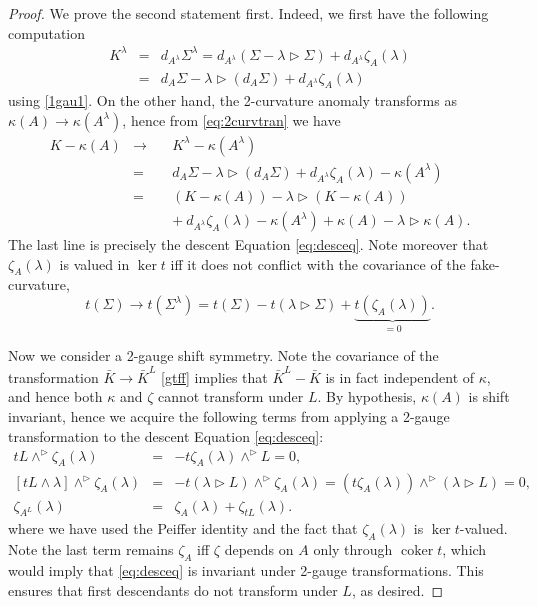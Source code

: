 \documentclass[onecolumn]{article}
\theoremstyle{theorem}
\theoremstyle{remark}
\theoremstyle{example}
\theoremstyle{definition}
\numberwithin{equation}{section}
\begin{document}
\begin{proof}
We prove the second statement first. Indeed, we first have the following computation 
\begin{eqnarray}
  K^\lambda &=& d_{A^\lambda}\Sigma^\lambda = d_{A^\lambda}(\Sigma-\lambda\rhd \Sigma) +d_{A^\lambda}\zeta_A(\lambda) \nonumber\\
  &=& d_A\Sigma - \lambda \rhd (d_A\Sigma) + d_{A^\lambda}\zeta_A(\lambda)\label{eq:2curvtran}
\end{eqnarray}
using \eqref{1gau1}. On the other hand, the 2-curvature anomaly transforms as $\kappa(A)\rightarrow \kappa(A^\lambda)$, hence from \eqref{eq:2curvtran} we have
\begin{eqnarray*}
    K - \kappa(A) &\rightarrow & K^\lambda -\kappa(A^\lambda) \\
    &=& d_A\Sigma - \lambda \rhd (d_A\Sigma) + d_{A^\lambda}\zeta_A(\lambda) - \kappa(A^\lambda) \\
    &=& (K-\kappa(A)) - \lambda\rhd(K-\kappa(A)) \\
    &\qquad& +~ d_{A^\lambda}\zeta_A(\lambda) - \kappa(A^\lambda) + \kappa(A)-\lambda\rhd\kappa(A).
\end{eqnarray*}
{The} last line is precisely the descent Equation \eqref{eq:desceq}. Note moreover that $\zeta_A(\lambda)$ is valued in $\operatorname{ker}t$ iff it does not conflict with the covariance of the fake-curvature,
\begin{equation}
    t(\Sigma) \rightarrow  t(\Sigma^\lambda) = t(\Sigma) - t(\lambda\rhd \Sigma) + \underbrace{t(\zeta_A(\lambda))}_{=0}. \nonumber
\end{equation}

Now we consider a 2-gauge shift symmetry. Note the covariance of the transformation $\bar K\rightarrow \bar K^L$ \eqref{gtff} implies that $\bar K^L -\bar K$ is in fact independent of $\kappa$, and hence both $\kappa$ and $\zeta$ cannot transform under $L$. By hypothesis, $\kappa(A)$ is shift invariant, hence we acquire the following terms from applying a 2-gauge transformation to the descent Equation \eqref{eq:desceq}:
\begin{eqnarray}
    tL\wedge^\rhd \zeta_A(\lambda) &=& -t\zeta_A(\lambda)\wedge^\rhd L=0,\nonumber\\
    {[tL\wedge \lambda]\wedge^\rhd\zeta_A(\lambda)} &=& -t(\lambda\rhd L)\wedge^\rhd\zeta_A(\lambda) = (t\zeta_A(\lambda))\wedge^\rhd(\lambda\rhd L)=0,\nonumber\\
    \zeta_{A^L}(\lambda) &=&\zeta_A(\lambda) + \zeta_{tL}(\lambda).
\end{eqnarray}
where we have used the Peiffer identity and the fact that $\zeta_A(\lambda)$ is $\operatorname{ker}t$-valued. Note the last term remains $\zeta_A$ iff $\zeta$ depends on $A$ only through $\operatorname{coker}t$, which would imply that \eqref{eq:desceq} is invariant under 2-gauge transformations. This ensures that first descendants do not transform under $L$, as desired.
\end{proof}
\end{document}
